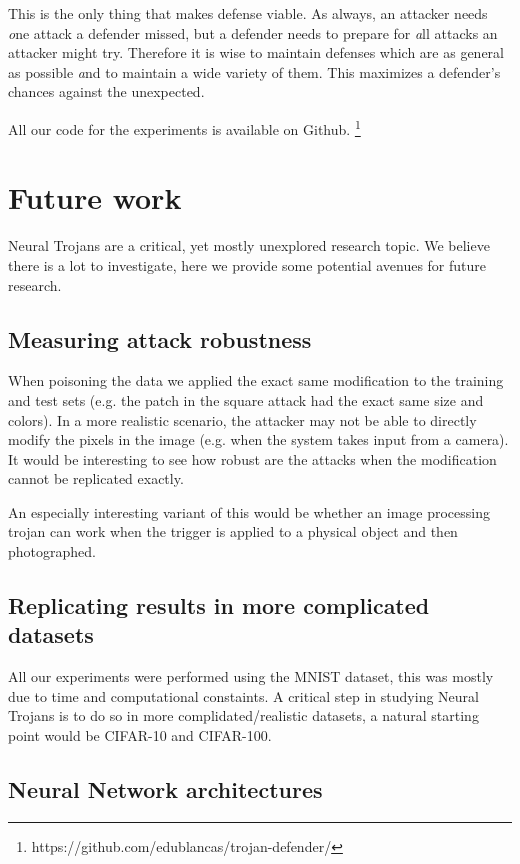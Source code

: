\documentclass[letterpaper, 10 pt, conference]{ieeeconf}  %
\begin{document}
This is the only thing that makes defense viable.  As always, an
attacker needs {\textit one} attack a defender missed, but a defender
needs to prepare for {\textit all} attacks an attacker might try.
Therefore it is wise to maintain defenses which are as general as
possible {\textit and} to maintain a wide variety of them.  This
maximizes a defender's chances against the unexpected.

All our code for the experiments is available on Github. \footnote{https://github.com/edublancas/trojan-defender/}

\section{Future work}

Neural Trojans are a critical, yet mostly unexplored research topic. We believe
there is a lot to investigate, here we provide some potential avenues for
future research.

\subsection{Measuring attack robustness}

When poisoning the data we applied the exact same modification to the training
and test sets (e.g. the patch in the square attack had the exact same size and
colors). In a more realistic scenario, the attacker may not be able to directly
modify the pixels in the image (e.g. when the system takes input from a
camera). It would be interesting to see how robust are the attacks when the
modification cannot be replicated exactly.

An especially interesting variant of this would be whether an image
processing trojan can work when the trigger is applied to a physical
object and then photographed.

\subsection{Replicating results in more complicated datasets}

All our experiments were performed using the MNIST dataset, this was mostly due
to time and computational constaints. A critical step in studying Neural
Trojans is to do so in more complidated/realistic datasets, a natural starting
point would be CIFAR-10 and CIFAR-100.

\subsection{Neural Network architectures}
\end{document}
